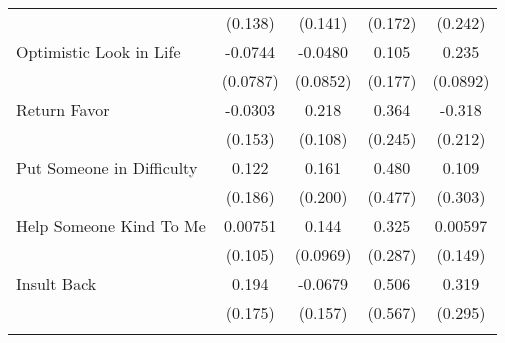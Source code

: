 {\begin{tabular}{l*{4}{c}}
            &     (0.138)         &     (0.141)         &     (0.172)         &     (0.242)         \\
[1em]
Optimistic Look in Life&     -0.0744         &     -0.0480         &       0.105         &       0.235\sym{**} \\
            &    (0.0787)         &    (0.0852)         &     (0.177)         &    (0.0892)         \\
[1em]
Return Favor&     -0.0303         &       0.218\sym{*}  &       0.364         &      -0.318         \\
            &     (0.153)         &     (0.108)         &     (0.245)         &     (0.212)         \\
[1em]
Put Someone in Difficulty&       0.122         &       0.161         &       0.480         &       0.109         \\
            &     (0.186)         &     (0.200)         &     (0.477)         &     (0.303)         \\
[1em]
Help Someone Kind To Me&     0.00751         &       0.144         &       0.325         &     0.00597         \\
            &     (0.105)         &    (0.0969)         &     (0.287)         &     (0.149)         \\
[1em]
Insult Back &       0.194         &     -0.0679         &       0.506         &       0.319         \\
            &     (0.175)         &     (0.157)         &     (0.567)         &     (0.295)         \\
\hline\hline
{}\\
\end{tabular}
}
